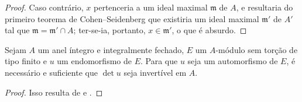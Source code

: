 \documentclass[oneside,10pt]{amsart}
\let\EGAOriginalLabel\label
\renewcommand{\label}[1]{\phantomsection\EGAOriginalLabel{#1}}
\begin{document}
\begin{proof}
Caso contrário, $x$ pertenceria a um ideal maximal $\mathfrak{m}$ de $A$, e resultaria do primeiro teorema de Cohen--Seidenberg \cite[t.~I, p.~257, th.~3]{I-13} que existiria um ideal maximal $\mathfrak{m}'$ de $A'$ tal que $\mathfrak{m}=\mathfrak{m}'\cap A$;
ter-se-ia, portanto, $x\in\mathfrak{m}'$, o que é absurdo.
\end{proof}

\begin{corollary}[6.4.6]
\label{II.6.4.6}
Sejam $A$ um anel íntegro e integralmente fechado, $E$ um $A$-módulo sem torção de tipo finito e $u$ um endomorfismo de $E$.
Para que $u$ seja um automorfismo de $E$, é necessário e suficiente que $\det u$ seja invertível em $A$.
\end{corollary}

\begin{proof}
Isso resulta de  e .
\end{proof}
\end{document}
